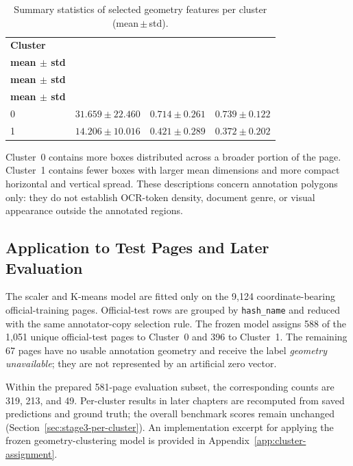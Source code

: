 \begin{table}[H]
    \centering
    \small
    \caption{Summary statistics of selected geometry features per cluster (mean\,$\pm$\,std).}
    \label{tab:stage2_cluster_stats}
    \begin{tabular}{@{}lrrr@{}}
        \toprule
        \textbf{Cluster}
            & \shortstack{\textbf{$n_{\text{boxes}}$}\\\textbf{mean $\pm$ std}}
            & \shortstack{\textbf{Vertical spread}\\\textbf{mean $\pm$ std}}
            & \shortstack{\textbf{Horizontal spread}\\\textbf{mean $\pm$ std}} \\
        \midrule
        0 & $31.659 \pm 22.460$ & $0.714 \pm 0.261$ & $0.739 \pm 0.122$ \\
        1 & $14.206 \pm 10.016$ & $0.421 \pm 0.289$ & $0.372 \pm 0.202$ \\
        \bottomrule
    \end{tabular}
\end{table}

Cluster~0 contains more boxes distributed across a broader portion of the page. Cluster~1 contains fewer boxes with larger mean dimensions and more compact horizontal and vertical spread. These descriptions concern annotation polygons only: they do not establish OCR-token density, document genre, or visual appearance outside the annotated regions.

\subsection{Application to Test Pages and Later Evaluation}
\label{subsec:cluster_use}

The scaler and K-means model are fitted only on the 9{,}124
coordinate-bearing official-training pages. Official-test rows are grouped by
\texttt{hash\_name} and reduced with the same annotator-copy selection rule.
The frozen model assigns 588 of the 1{,}051 unique official-test pages to
Cluster~0 and 396 to Cluster~1. The remaining 67 pages have no usable
annotation geometry and receive the label \emph{geometry unavailable}; they
are not represented by an artificial zero vector.

Within the prepared 581-page evaluation subset, the corresponding counts are
319, 213, and 49. Per-cluster results in later chapters are recomputed from
saved predictions and ground truth; the overall benchmark scores remain
unchanged (Section~\ref{sec:stage3-per-cluster}). An implementation excerpt
for applying the frozen geometry-clustering model is provided in
Appendix~\ref{app:cluster-assignment}.

